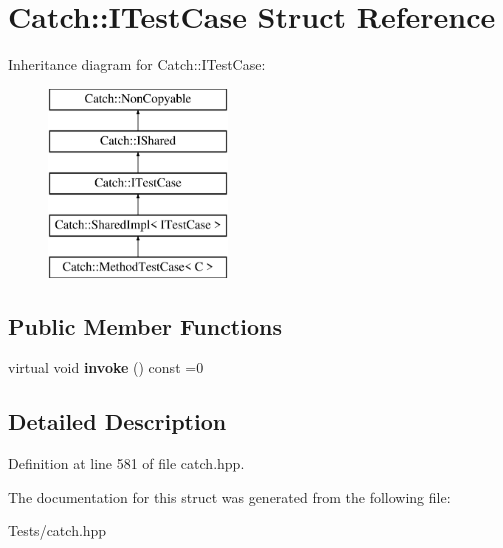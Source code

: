 \hypertarget{struct_catch_1_1_i_test_case}{}\section{Catch\+:\+:I\+Test\+Case Struct Reference}
\label{struct_catch_1_1_i_test_case}
Inheritance diagram for Catch\+:\+:I\+Test\+Case\+:\begin{figure}[H]
\begin{center}
\leavevmode
\includegraphics[height=5.000000cm]{struct_catch_1_1_i_test_case}
\end{center}
\end{figure}
\subsection*{Public Member Functions}
\begin{DoxyCompactItemize}
\item 
\mbox{\label{struct_catch_1_1_i_test_case_a678825e62e7c17297621cfeb65588c34}} 
virtual void {\bfseries invoke} () const =0
\end{DoxyCompactItemize}


\subsection{Detailed Description}


Definition at line 581 of file catch.\+hpp.



The documentation for this struct was generated from the following file\+:\begin{DoxyCompactItemize}
\item 
Tests/catch.\+hpp\end{DoxyCompactItemize}
